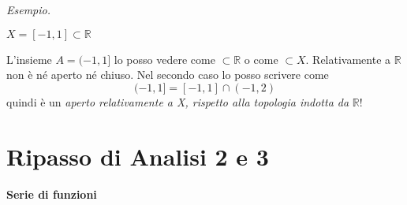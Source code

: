 \documentclass[10pt,a4paper,twoside,openright]{book}
\begin{document}
\textit{Esempio.}

$X=[ -1,1] \subset \mathbb{R}$

L'insieme $A=( -1,1]$ lo posso vedere come $\subset \mathbb{R}$ o come $\subset X$. Relativamente a $\displaystyle \mathbb{R}$ non è né aperto né chiuso. Nel secondo caso lo posso scrivere come
\begin{equation*}
( -1,1] =[ -1,1] \cap (-1,2)
\end{equation*}
quindi è un \textit{aperto relativamente a X, rispetto alla topologia indotta da }$\displaystyle \mathbb{R}$!
\section{Ripasso di Analisi 2 e 3}

\textbf{Serie di funzioni}
\end{document}
